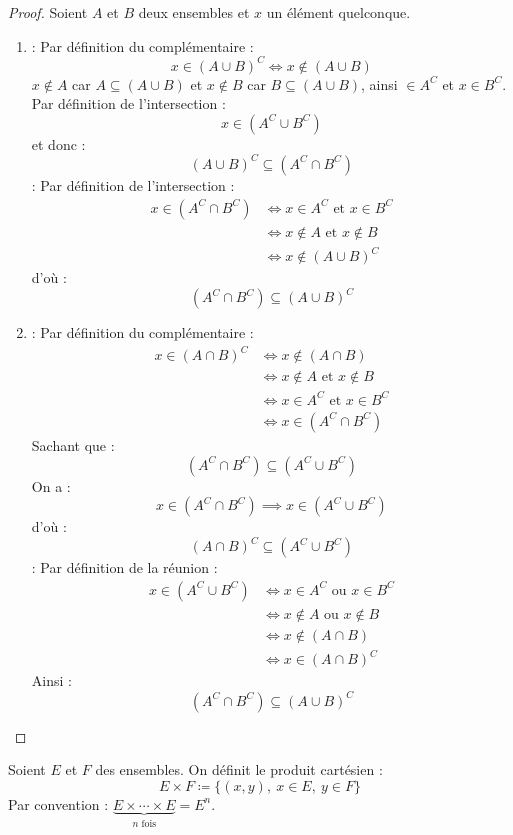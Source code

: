 \begin{proof}
	Soient $A$ et $B$ deux ensembles et $x$ un élément quelconque. 
	\begin{enumerate}
		\item \boxed{\subseteq} : Par définition du complémentaire :
		\[ x \in (A \cup B)^C \iff x \notin (A \cup B) \]
		$x \notin A$ car $A \subseteq (A \cup B)$ et $x \notin B$ car $B \subseteq (A \cup B)$, ainsi $ \in A^C$ et $x \in B^C$. 
		\\
		Par définition de l'intersection :
		\[ x \in (A^C \cup B^C) \]
		et donc :
		\[ (A \cup B)^C \subseteq (A^C \cap B^C) \]
		\boxed{\supseteq} : Par définition de l'intersection :
		\begin{align*}
			x \in (A^C \cap B^C) &\iff x \in A^C \text{ et } x \in B^C \\
			&\iff x \notin A \text{ et } x \notin B \\
			&\iff x \notin (A \cup B)^C
		\end{align*}
		d'où :
		\[ (A^C \cap B^C) \subseteq (A \cup B)^C \]
		\item \boxed{\subseteq} : Par définition du complémentaire :
		\begin{align*}
			x \in (A \cap B)^C &\iff x \notin (A \cap B) \\
			&\iff x \notin A \text{ et } x \notin B \\
			&\iff x \in A^C \text{ et } x \in B^C \\
			&\iff x \in (A^C \cap B^C)
		\end{align*}
		Sachant que :
		\[ (A^C \cap B^C) \subseteq (A^C \cup B^C) \]
		On a :
		\[ x \in (A^C \cap B^C) \implies x \in (A^C \cup B^C) \]
		d'où :
		\[ (A \cap B)^C \subseteq (A^C \cup B^C) \]
		\boxed{\supseteq} : Par définition de la réunion :
		\begin{align*}
			x \in (A^C \cup B^C) &\iff x \in A^C \text{ ou } x \in B^C \\
			&\iff x \notin A \text{ ou } x \notin B \\
			&\iff x \notin (A \cap B) \\
			&\iff x \in (A \cap B)^C
		\end{align*}
		Ainsi : 
		\[ (A^C \cap B^C) \subseteq (A \cup B)^C \]
	\end{enumerate}
\end{proof}

\begin{definition}
    Soient $E$ et $F$ des ensembles. On définit le produit cartésien :
    \[ E \times F \coloneqq \{ (x, y),\ x \in E,\ y \in F \} \]
    Par convention : $\underbrace{E \times \cdots \times E}_{n \text{ fois}} = E^n$.
\end{definition}
